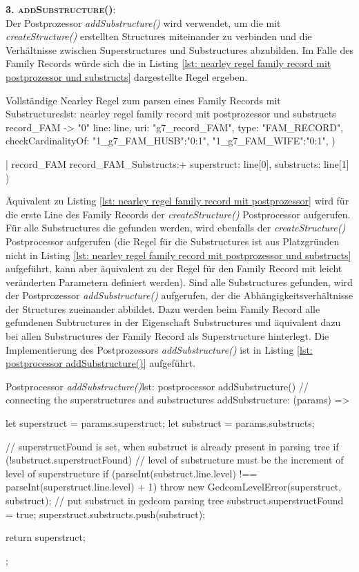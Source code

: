 \textsc{\textbf{3. addSubstructure()}:} \vspace{0.5em} \\
Der Postprozessor \textit{addSubstructure()} wird verwendet, um die mit \textit{createStructure()} erstellten Structures miteinander zu verbinden und die Verhältnisse zwischen Superstructures und Substructures abzubilden. Im Falle des Family Records würde sich die in Listing \ref{lst: nearley regel family record mit postprozessor und substructs} dargestellte Regel ergeben. 
\vspace{1em}
\begin{javascript}{Vollständige Nearley Regel zum parsen eines Family Records mit Substructures}{lst: nearley regel family record mit postprozessor und substructs}
	record_FAM
		-> "0"  %
			{%
					line: line,
					uri: "g7_record_FAM", 
					type: "FAM_RECORD", 
					checkCardinalityOf: {
						"1_g7_FAM_HUSB":"0:1", 
						"1_g7_FAM_WIFE":"0:1",
					}
				}) 
		
		|  record_FAM  record_FAM_Substructs:+
			{%
					superstruct: line[0], 
					substructs: line[1]
				})
\end{javascript}
\vspace{1em}
Äquivalent zu Listing \ref{lst: nearley regel family record mit postprozessor} wird für die erste Line des Family Records der \textit{createStructure()} Postprocessor aufgerufen. Für alle Substructures die gefunden werden, wird ebenfalls der \textit{createStructure()} Postprocessor aufgerufen (die Regel für die Substructures ist aus Platzgründen nicht in Listing \ref{lst: nearley regel family record mit postprozessor und substructs} aufgeführt, kann aber äquivalent zu der Regel für den Family Record mit leicht veränderten Parametern definiert werden). Sind alle Substructures gefunden, wird der Postprozessor \textit{addSubstructure()} aufgerufen, der die Abhängigkeitsverhältnisse der Structures zueinander abbildet. Dazu werden beim Family Record alle gefundenen Subtructures in der Eigenschaft Substructures und äquivalent dazu bei allen Substructures der Family Record als Superstructure hinterlegt. Die Implementierung des Postprozessors \textit{addSubstructure()} ist in Listing \ref{lst: postprocessor addSubstructure()} aufgeführt.
\vspace{1em}
\begin{javascript}{Postprocessor \textit{addSubstructure()}}{lst: postprocessor addSubstructure()}
	// connecting the superstructures and substructures
	addSubstructure: (params) => {
		let superstruct = params.superstruct;
		let substruct = params.substructs;
		
		// superstructFound is set, when substruct is already present in parsing tree
		if (!substruct.superstructFound) {
			// level of substructure must be the increment of level of superstructure
			if (parseInt(substruct.line.level) !== parseInt(superstruct.line.level) + 1) throw new GedcomLevelError(superstruct, substruct);
			// put substruct in gedcom parsing tree
			substruct.superstructFound = true;
			superstruct.substructs.push(substruct);
		}
		
		return superstruct;
	};
\end{javascript}
